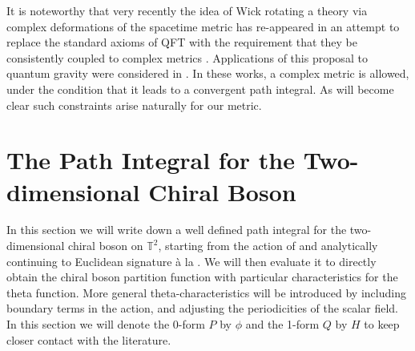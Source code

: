 \documentclass[11pt]{article}
\numberwithin{equation}{section}
\begin{document}
 It is noteworthy that very recently the idea of Wick rotating a theory via complex deformations of the spacetime metric has re-appeared in an attempt to replace the standard axioms of QFT with the requirement that they be consistently coupled to complex metrics \cite{Kontsevich:2021dmb}. Applications of this proposal to quantum gravity were considered in \cite{Witten:2021nzp}. In these works, a complex metric is allowed, under the condition that it leads to a convergent path integral. As will become clear such constraints arise naturally for our metric.


\section{The Path Integral for the Two-dimensional Chiral Boson}\label{2DPI}

In this section we will write down a well defined path integral for the two-dimensional chiral boson on ${\mathbb T}^2$, starting from the action of \cite{Sen:2019qit,Andriolo:2020ykk} and analytically continuing to Euclidean signature à la \cite{Visser:2017atf}. We will then evaluate it to directly obtain the chiral boson partition  function with  particular characteristics for the theta function. More general theta-characteristics will be introduced by including boundary terms in the action, and adjusting the periodicities of the scalar field. In this section we will denote the 0-form $P$ by $\phi$ and the 1-form $Q$ by $H$ to keep closer contact with the literature.
\end{document}
